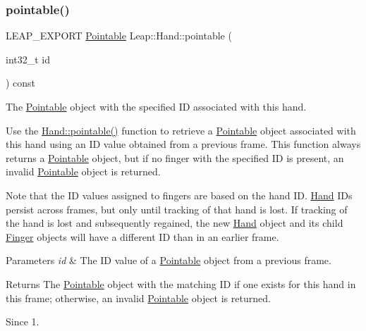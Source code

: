 \subsubsection{\texorpdfstring{pointable()}{pointable()}}
{\footnotesize\ttfamily L\+E\+A\+P\+\_\+\+E\+X\+P\+O\+RT \hyperlink{class_leap_1_1_pointable}{Pointable} Leap\+::\+Hand\+::pointable (\begin{DoxyParamCaption}\item[{int32\+\_\+t}]{id }\end{DoxyParamCaption}) const}

The \hyperlink{class_leap_1_1_pointable}{Pointable} object with the specified ID associated with this hand.

Use the \hyperlink{class_leap_1_1_hand_aa9e572f18122453856267a527abf2bcb}{Hand\+::pointable()} function to retrieve a \hyperlink{class_leap_1_1_pointable}{Pointable} object associated with this hand using an ID value obtained from a previous frame. This function always returns a \hyperlink{class_leap_1_1_pointable}{Pointable} object, but if no finger with the specified ID is present, an invalid \hyperlink{class_leap_1_1_pointable}{Pointable} object is returned.


\begin{DoxyCodeInclude}
\end{DoxyCodeInclude}


Note that the ID values assigned to fingers are based on the hand ID. \hyperlink{class_leap_1_1_hand}{Hand} I\+Ds persist across frames, but only until tracking of that hand is lost. If tracking of the hand is lost and subsequently regained, the new \hyperlink{class_leap_1_1_hand}{Hand} object and its child \hyperlink{class_leap_1_1_finger}{Finger} objects will have a different ID than in an earlier frame.


\begin{DoxyParams}{Parameters}
{\em id} & The ID value of a \hyperlink{class_leap_1_1_pointable}{Pointable} object from a previous frame. \\
\hline
\end{DoxyParams}
\begin{DoxyReturn}{Returns}
The \hyperlink{class_leap_1_1_pointable}{Pointable} object with the matching ID if one exists for this hand in this frame; otherwise, an invalid \hyperlink{class_leap_1_1_pointable}{Pointable} object is returned. 
\end{DoxyReturn}
\begin{DoxySince}{Since}
1. 
\end{DoxySince}
\mbox{\label{class_leap_1_1_hand_a845e544e674ab315f10ead9f4a7210fe}} 
